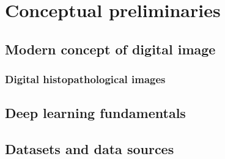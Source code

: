 \chapter{Conceptual preliminaries}\label{cap:conceptual_preliminaries}

\section{Modern concept of digital image}

\subsection{Digital histopathological images}

\section{Deep learning fundamentals}

\section{Datasets and data sources}
